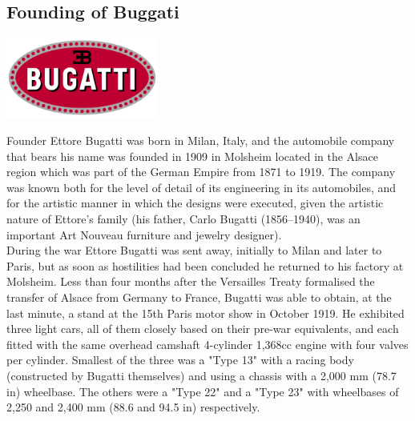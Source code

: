 \documentclass[11pt]{report}
\begin{document}
\subsection{Founding of Buggati}
\vspace{2mm}\begin{center}\includegraphics[width=5cm]{./img/bugattiLogo.jpg}\end{center}
Founder Ettore Bugatti was born in Milan, Italy, and the automobile company that bears his name was founded in 1909 in Molsheim located in the Alsace region which was part of the German Empire from 1871 to 1919. The company was known both for the level of detail of its engineering in its automobiles, and for the artistic manner in which the designs were executed, given the artistic nature of Ettore's family (his father, Carlo Bugatti (1856–1940), was an important Art Nouveau furniture and jewelry designer).\\ \indent During the war Ettore Bugatti was sent away, initially to Milan and later to Paris, but as soon as hostilities had been concluded he returned to his factory at Molsheim. Less than four months after the Versailles Treaty formalised the transfer of Alsace from Germany to France, Bugatti was able to obtain, at the last minute, a stand at the 15th Paris motor show in October 1919. He exhibited three light cars, all of them closely based on their pre-war equivalents, and each fitted with the same overhead camshaft 4-cylinder 1,368cc engine with four valves per cylinder. Smallest of the three was a "Type 13" with a racing body (constructed by Bugatti themselves) and using a chassis with a 2,000 mm (78.7 in) wheelbase. The others were a "Type 22" and a "Type 23" with wheelbases of 2,250 and 2,400 mm (88.6 and 94.5 in) respectively.
\end{document}

